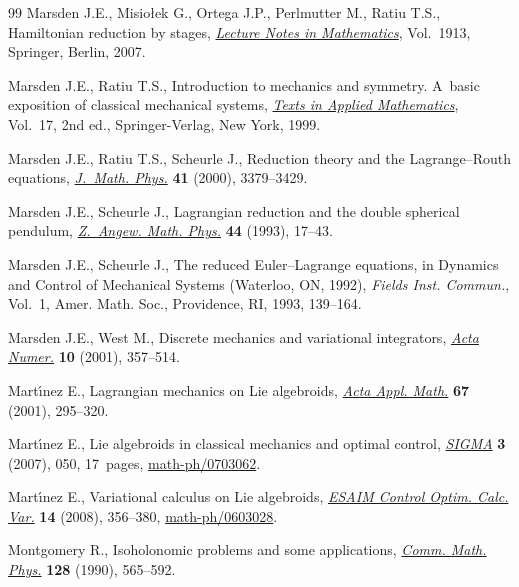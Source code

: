\documentclass[pdftex]{sigma}
\numberwithin{equation}{section}
\begin{document}
\begin{thebibliography}{99}
Marsden J.E., Misio{\l}ek G., Ortega J.P., Perlmutter M., Ratiu T.S.,
 Hamiltonian reduction by stages, \href{https://doi.org/10.1007/978-3-540-72470-4}{\textit{Lecture Notes in Mathematics}}, Vol.~1913, Springer, Berlin, 2007.

Marsden J.E., Ratiu T.S., Introduction to mechanics and symmetry. A~basic
 exposition of classical mechanical systems, \href{https://doi.org/10.1007/978-0-387-21792-5}{\textit{Texts in Applied
 Mathematics}}, Vol.~17, 2nd ed., Springer-Verlag, New York, 1999.

Marsden J.E., Ratiu T.S., Scheurle J., Reduction theory and the
 {L}agrange--{R}outh equations, \href{https://doi.org/10.1063/1.533317}{\textit{J.~Math. Phys.}} \textbf{41} (2000),
 3379--3429.

Marsden J.E., Scheurle J., Lagrangian reduction and the double spherical
 pendulum, \href{https://doi.org/10.1007/BF00914351}{\textit{Z.~Angew. Math. Phys.}} \textbf{44} (1993), 17--43.

Marsden J.E., Scheurle J., The reduced {E}uler--{L}agrange equations, in
 Dynamics and Control of Mechanical Systems ({W}aterloo, {ON}, 1992),
 \textit{Fields Inst. Commun.}, Vol.~1, Amer. Math. Soc., Providence, RI,
 1993, 139--164.

Marsden J.E., West M., Discrete mechanics and variational integrators,
 \href{https://doi.org/10.1017/S096249290100006X}{\textit{Acta Numer.}} \textbf{10} (2001), 357--514.

Mart\'{\i}nez E., Lagrangian mechanics on {L}ie algebroids, \href{https://doi.org/10.1023/A:1011965919259}{\textit{Acta Appl.
 Math.}} \textbf{67} (2001), 295--320.

Mart\'{\i}nez E., Lie algebroids in classical mechanics and optimal control,
 \href{https://doi.org/10.3842/SIGMA.2007.050}{\textit{SIGMA}} \textbf{3} (2007), 050, 17~pages, \href{http://arxiv.org/abs/math-ph/0703062}{math-ph/0703062}.

Mart\'{\i}nez E., Variational calculus on {L}ie algebroids, \href{https://doi.org/10.1051/cocv:2007056}{\textit{ESAIM
 Control Optim. Calc. Var.}} \textbf{14} (2008), 356--380,
 \href{http://arxiv.org/abs/math-ph/0603028}{math-ph/0603028}.

Montgomery R., Isoholonomic problems and some applications, \href{https://doi.org/10.1007/BF02096874}{\textit{Comm. Math.
 Phys.}} \textbf{128} (1990), 565--592.


\end{thebibliography}
\end{document}
